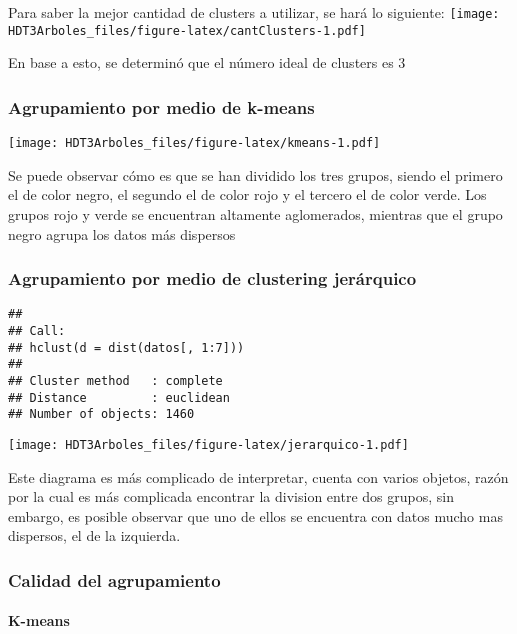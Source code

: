 \documentclass[
]{article}
\begin{document}
Para saber la mejor cantidad de clusters a utilizar, se hará lo
siguiente:
\texttt{[image: HDT3Arboles\_files/figure-latex/cantClusters-1.pdf]}

En base a esto, se determinó que el número ideal de clusters es 3

\hypertarget{agrupamiento-por-medio-de-k-means}{%
\subsubsection{Agrupamiento por medio de
k-means}\label{agrupamiento-por-medio-de-k-means}}

\texttt{[image: HDT3Arboles\_files/figure-latex/kmeans-1.pdf]}

Se puede observar cómo es que se han dividido los tres grupos, siendo el
primero el de color negro, el segundo el de color rojo y el tercero el
de color verde. Los grupos rojo y verde se encuentran altamente
aglomerados, mientras que el grupo negro agrupa los datos más dispersos

\hypertarget{agrupamiento-por-medio-de-clustering-jeruxe1rquico}{%
\subsubsection{Agrupamiento por medio de clustering
jerárquico}\label{agrupamiento-por-medio-de-clustering-jeruxe1rquico}}

\begin{verbatim}
## 
## Call:
## hclust(d = dist(datos[, 1:7]))
## 
## Cluster method   : complete 
## Distance         : euclidean 
## Number of objects: 1460
\end{verbatim}

\texttt{[image: HDT3Arboles\_files/figure-latex/jerarquico-1.pdf]}

Este diagrama es más complicado de interpretar, cuenta con varios
objetos, razón por la cual es más complicada encontrar la division entre
dos grupos, sin embargo, es posible observar que uno de ellos se
encuentra con datos mucho mas dispersos, el de la izquierda.

\hypertarget{calidad-del-agrupamiento}{%
\subsubsection{Calidad del
agrupamiento}\label{calidad-del-agrupamiento}}

\hypertarget{k-means}{%
\paragraph{K-means}\label{k-means}}
\end{document}
